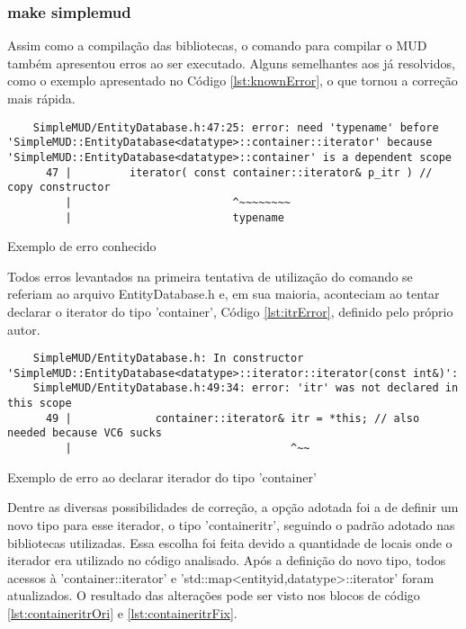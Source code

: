 \subsubsection{make simplemud}

Assim como a compilação das bibliotecas, o comando para compilar o MUD também apresentou 
erros ao ser executado. Alguns semelhantes aos já resolvidos, como o exemplo apresentado 
no Código \ref{lst:knownError}, o que tornou a correção mais rápida.

\begin{listing}[!ht]
    \begin{verbatim}
    SimpleMUD/EntityDatabase.h:47:25: error: need 'typename' before 'SimpleMUD::EntityDatabase<datatype>::container::iterator' because 'SimpleMUD::EntityDatabase<datatype>::container' is a dependent scope
      47 |         iterator( const container::iterator& p_itr ) // copy constructor
         |                         ^~~~~~~~~
         |                         typename 
    \end{verbatim}
\caption{Exemplo de erro conhecido}
\label{lst:knownError}
\end{listing}

Todos erros levantados na primeira tentativa de utilização do comando se referiam ao arquivo
EntityDatabase.h e, em sua maioria, aconteciam ao tentar declarar o iterator do tipo 'container',
Código \ref{lst:itrError}, definido pelo próprio autor.

\begin{listing}[!ht]
    \begin{verbatim}
    SimpleMUD/EntityDatabase.h: In constructor 'SimpleMUD::EntityDatabase<datatype>::iterator::iterator(const int&)':
    SimpleMUD/EntityDatabase.h:49:34: error: 'itr' was not declared in this scope
      49 |             container::iterator& itr = *this; // also needed because VC6 sucks
         |                                  ^~~
    \end{verbatim}
\caption{Exemplo de erro ao declarar iterador do tipo 'container'}
\label{lst:itrError}
\end{listing}

Dentre as diversas possibilidades de correção, a opção adotada foi a de definir um novo tipo para
esse iterador, o tipo 'containeritr', seguindo o padrão adotado nas bibliotecas utilizadas.
Essa escolha foi feita devido a quantidade de locais onde o iterador era utilizado no código analisado.
Após a definição do novo tipo, todos acessos à 'container::iterator' e  
'std::map<entityid,datatype>::iterator' foram atualizados. O resultado das alterações pode ser visto nos
blocos de código \ref{lst:containeritrOri} e \ref{lst:containeritrFix}.

